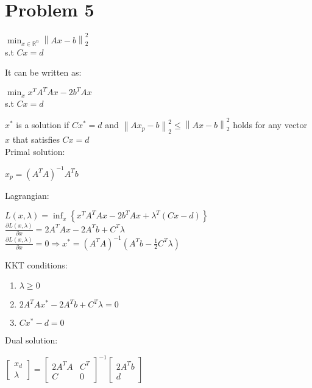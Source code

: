 \documentclass{article}
\begin{document}
\section{Problem 5}
\begin{center}
$\displaystyle \min_{x\in \mathbb{R}^n} \left\| Ax-b \right\|_2^2$\\
s.t $Cx=d$
\end{center}
It can be written as:
\begin{center}
$\displaystyle \min_{x} x^T A^T A x - 2b^TAx$\\
s.t $Cx=d$
\end{center}
$x^*$ is a solution if $Cx^*=d$ and $\left\| Ax_p-b \right\|_2^2 \leq \left\| Ax-b \right\|_2^2$ holds for any vector $x$ that satisfies $Cx=d$\\
\vspace{5mm}
Primal solution:
\begin{center}
$x_p = (A^TA)^{-1}A^Tb$
\end{center}
Lagrangian:
\begin{center}
$L(x,\lambda) = \inf_x \left\{ x^TA^TAx - 2b^T Ax + \lambda^T(Cx-d) \right\}$\\
\vspace{5mm}
$\frac{\partial L(x,\lambda)}{\partial x}=2A^TAx-2A^Tb+C^T\lambda$\\
\vspace{5mm}
$\frac{\partial L(x,\lambda)}{\partial x}=0 \Rightarrow x^* = (A^TA)^{-1}(A^Tb-\frac{1}{2}C^T\lambda)$
\end{center}
KKT conditions:
\begin{enumerate}
\item $\lambda \geq 0$
\item $2A^TAx^* - 2 A^Tb+C^T\lambda = 0$
\item $Cx^* -d = 0$
\end{enumerate}
\vspace{5mm}
Dual solution:
\begin{center}
$\begin{bmatrix}
x_d\\
\lambda
\end{bmatrix} = \begin{bmatrix}
2A^TA & C^T\\
C & 0 
\end{bmatrix}^{-1}\begin{bmatrix}
2A^Tb\\
d
\end{bmatrix}$
\end{center}
\end{document}
